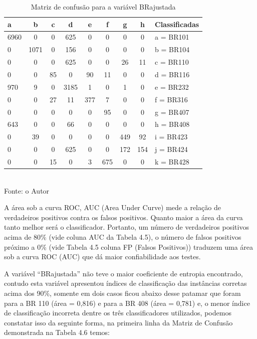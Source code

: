 \begin{enumerate}
	\begin{table}[!ht]
		\centering
		\caption{Matriz de confusão para a variável BRajustada}
		\vspace{1mm}
		\begin{tabular}{l|c|c|c|c|c|c|c|l}
			\hline
			\textbf{a} & \textbf{b} & \textbf{c} & \textbf{d} & \textbf{e} & \textbf{f} & \textbf{g} & \textbf{h} & \textbf{Classificadas}\\
			\hline
			6960 & 0 & 0 & 625 & 0 & 0 & 0 & 0 & a = BR101 \\
			0 & 1071 & 0 & 156 & 0 & 0 & 0 & 0  & b = BR104 \\
			0 & 0 & 0 & 625 & 0 & 0 & 26 & 11  & c = BR110 \\
			0 & 0 & 85 & 0 & 90 & 11 & 0 & 0  & d = BR116 \\
			970 & 9 & 0 & 3185 & 1 & 0 & 1 & 0  & e = BR232 \\
			0 & 0 & 27 & 11 & 377 & 7 & 0 & 0  & f = BR316 \\
			0 & 0 & 0 & 0 & 0 & 95 & 0 & 0  & g = BR407 \\
			643 & 0 & 0 & 66 & 0 & 0 & 0 & 0  & h = BR408 \\
			0 & 39 & 0 & 0 & 0 & 0 & 449 & 92  & i = BR423 \\
			0 & 0 & 0 & 625 & 0 & 0 & 172 & 154  & j = BR424 \\
			0 & 0 & 15 & 0 & 3 & 675 & 0 & 0  & k = BR428 \\			
		\end{tabular}
		\\
		\tiny Fonte: o Autor
	\end{table}	

\end{enumerate}


A área sob a curva ROC, AUC (Area Under Curve) mede a
relação de verdadeiros positivos contra os falsos positivos.
Quanto maior a área da curva tanto melhor será o
classificador. Portanto, um número de verdadeiros positivos
acima de 80\% (vide coluna AUC da Tabela 4.5), o número de falsos positivos próximo a 0\% (vide Tabela 4.5 coluna FP (Falsos Positivos))
traduzem uma área sob a curva ROC (AUC) que dá maior confiabilidade
aos testes.

\pagebreak

A variável “BRajustada” não teve o maior coeficiente de
entropia encontrado, contudo esta variável apresentou
índices de classificação das instâncias corretas acima dos 90\%, somente em dois casos ficou abaixo desse patamar que foram para a BR 110 (área = 0,816) e para a BR 408 (área = 0,781) e,
o menor índice de classificação incorreta dentre os três
classificadores utilizados, podemos constatar isso da seguinte forma, na primeira linha da Matriz de Confusão demonstrada na Tabela 4.6 temos:


